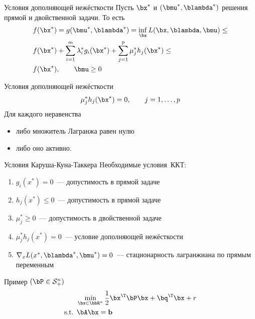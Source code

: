\documentclass[12pt]{beamer}
\begin{document}
\begin{frame}{Условия дополняющей нежёсткости}
Пусть $\bx^*$ и $(\bmu^*, \blambda^*)$ решения прямой и двойственной задачи. То есть
\begin{equation*}
\begin{split}
& f(\bx^*) = g(\bmu^*, \blambda^*) = \inf\limits_{\bx} L(\bx, \blambda, \bmu) \leq \\
& f(\bx^*) + \sum\limits_{i=1}^m\lambda^*_i g_i(\bx^*) + \sum\limits_{j=1}^p \mu^*_j h_j(\bx^*) \leq\\
& f(\bx^*), \qquad \bmu \geq 0 
\end{split}
\end{equation*}

\begin{block}{Условия дополняющей нежёсткости}
\[
\mu^*_j h_j(\bx^*) = 0, \qquad j = 1,\ldots,p 
\]
Для каждого неравенства
\begin{itemize}
\item либо множитель Лагранжа равен нулю
\item либо оно активно.
\end{itemize} 
\end{block}
\end{frame}

\begin{frame}{Условия Каруша-Куна-Таккера}
Hеобходимые условия~ККТ: 
\begin{enumerate}
\item $g_i(x^*) = 0$~--- допустимость в прямой задаче
\item $h_j(x^*) \leq 0$~--- допустимость в прямой задаче
\item $ \mu^*_j \geq 0$~--- допустимость в двойственной задаче
\item $\mu^*_jh_j(x^*) = 0$~--- условие дополняющей нежёсткости
\item $\nabla_x L(x^*, \blambda^*, \bmu^*) = 0$~--- стационарность лагранжиана по прямым переменным
\end{enumerate}
Пример $(\bP \in \mathcal{S}^n_+)$
\begin{equation*}
\begin{split}
& \min\limits_{\bx \in \bbR^n} \frac{1}{2}\bx^{\T}\bP\bx + \bq^{\T}\bx + r\\
\text{s.t. } & \bA\bx = \mathbf{b}
\end{split}
\end{equation*}
\end{frame}
\end{document}
